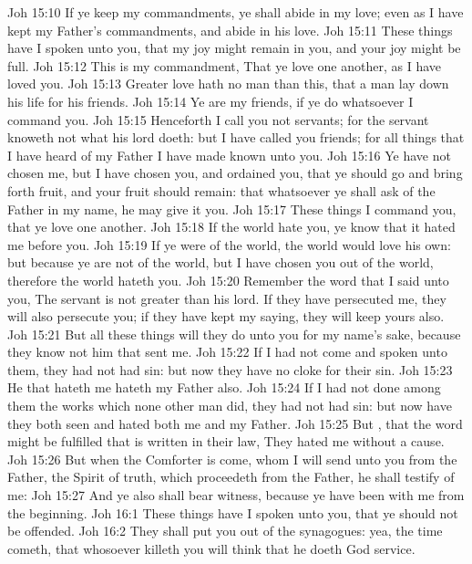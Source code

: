 \vs Joh 15:10 If ye keep my commandments, ye shall abide in my love; even as I have kept my Father's commandments, and abide in his love.
\vs Joh 15:11 These things have I spoken unto you, that my joy might remain in you, and  your joy might be full.
\vs Joh 15:12 This is my commandment, That ye love one another, as I have loved you.
\vs Joh 15:13 Greater love hath no man than this, that a man lay down his life for his friends.
\vs Joh 15:14 Ye are my friends, if ye do whatsoever I command you.
\vs Joh 15:15 Henceforth I call you not servants; for the servant knoweth not what his lord doeth: but I have called you friends; for all things that I have heard of my Father I have made known unto you.
\vs Joh 15:16 Ye have not chosen me, but I have chosen you, and ordained you, that ye should go and bring forth fruit, and  your fruit should remain: that whatsoever ye shall ask of the Father in my name, he may give it you.
\vs Joh 15:17 These things I command you, that ye love one another.
\vs Joh 15:18 If the world hate you, ye know that it hated me before  you.
\vs Joh 15:19 If ye were of the world, the world would love his own: but because ye are not of the world, but I have chosen you out of the world, therefore the world hateth you.
\vs Joh 15:20 Remember the word that I said unto you, The servant is not greater than his lord. If they have persecuted me, they will also persecute you; if they have kept my saying, they will keep yours also.
\vs Joh 15:21 But all these things will they do unto you for my name's sake, because they know not him that sent me.
\vs Joh 15:22 If I had not come and spoken unto them, they had not had sin: but now they have no cloke for their sin.
\vs Joh 15:23 He that hateth me hateth my Father also.
\vs Joh 15:24 If I had not done among them the works which none other man did, they had not had sin: but now have they both seen and hated both me and my Father.
\vs Joh 15:25 But , that the word might be fulfilled that is written in their law, They hated me without a cause.
\vs Joh 15:26 But when the Comforter is come, whom I will send unto you from the Father,  the Spirit of truth, which proceedeth from the Father, he shall testify of me:
\vs Joh 15:27 And ye also shall bear witness, because ye have been with me from the beginning.
\vs Joh 16:1 These things have I spoken unto you, that ye should not be offended.
\vs Joh 16:2 They shall put you out of the synagogues: yea, the time cometh, that whosoever killeth you will think that he doeth God service.
